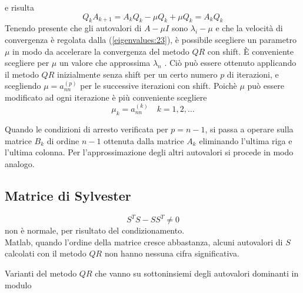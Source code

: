 e risulta
$$Q_k A_{k+1} = A_k Q_k − \mu Q_k + \mu Q_k = A_k Q_k $$
Tenendo presente che gli autovalori di $A − \mu I$ sono $\lambda_i − \mu$ e che
 la velocit\`a
di convergenza \`e regolata dalla (\ref{eigenvalues:23}), \`e
 possibile scegliere un parametro $\mu$
in modo da accelerare la convergenza del metodo $QR$ con shift. \`E conveniente
scegliere per $\mu$ un valore che approssima $\lambda_n$ . Ci\`o pu\`o essere ottenuto
applicando il metodo $QR$ inizialmente senza shift per un certo numero $p$ di
iterazioni, e scegliendo $\mu = a_{nn}^{(p)}$ per le successive iterazioni con shift.
Poich\`e $\mu$ pu\`o essere modificato ad ogni iterazione \`e pi\`u conveniente
scegliere
\begin{equation}
\label{eigenvalues:24}
\mu_k = a_{nn}^{(k)} \quad k = 1, 2, \ldots
\end{equation}

Quando le condizioni di arresto verificata per $p = n−1$, si passa a operare sulla matrice
$B_k$ di ordine $n - 1$ ottenuta dalla matrice $A_k$ eliminando l'ultima riga e
l'ultima colonna. Per l'approssimazione degli altri autovalori si procede in
modo analogo.

\subsection{Matrice di Sylvester}
\begin{workinprogress}
 $$ S^{T}S - SS^{T} \neq 0$$
 non \`e normale, per risultato del condizionamento. \\
Matlab, quando l'ordine della matrice cresce abbastanza,
alcuni autovalori di $S$ calcolati con il metodo $QR$
non hanno nessuna cifra significativa.

Varianti del metodo $QR$ che vanno su sottoninsiemi
degli autovalori dominanti in modulo
\end{workinprogress}

